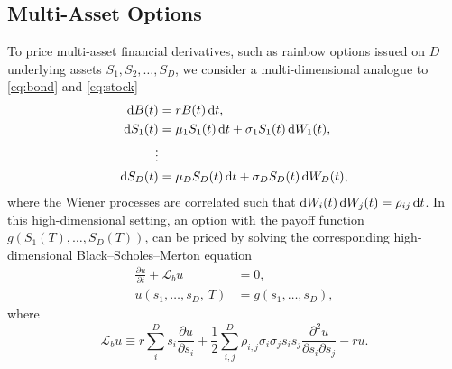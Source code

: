 \documentclass{UUThesisTemplate}
\begin{document}
\subsection{Multi-Asset Options}
\par To price multi-asset financial derivatives, such as rainbow options issued on $D$ underlying assets $S_1,S_2,\ldots,S_D$, we consider a multi-dimensional analogue to \eqref{eq:bond} and \eqref{eq:stock}
\begin{align}
\dif B(t)&=rB(t)\dif t, \nonumber \\
\dif S_1(t)&=\mu_1 S_1(t)\dif t+\sigma_1 S_1(t)\dif W_1(t), \nonumber \\
\vdots \nonumber \\ 
\dif S_D(t)&=\mu_D S_D(t)\dif t+\sigma_D S_D(t)\dif W_D(t), \label{eq:multi}
\end{align}
where the Wiener processes are correlated such that $\dif W_i(t)\dif W_j(t)=\rho_{ij}\dif t$. In this high-dimensional setting, an option with the payoff function $g(S_1(T),\ldots,S_D(T))$, can be priced by solving the corresponding high-dimensional Black--Scholes--Merton equation
\begin{align}
\frac{\partial u}{\partial t}+\mathcal{L}_b u&=0, \nonumber \\
u(s_1,\ldots,s_D,\ T)&=g(s_1,\ldots,s_D), \label{eq:bsD}
\end{align}
where
\begin{equation}
\label{eqBSop}
\mathcal{L}_b u \equiv r\sum\limits_{i}^{D}s_i\frac{\partial u}{\partial{s_i}}+\frac{1}{2}\sum\limits_{i,j}^{D}\rho_{i,j}\sigma_i\sigma_j s_is_j\frac{\partial^2u}{\partial s_i \partial s_j}-ru.
\end{equation}
\end{document}
